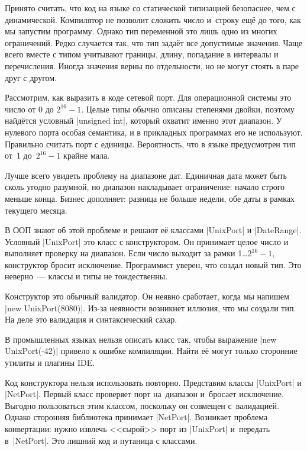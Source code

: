 \label{type-and-pred}


Принято считать, что код на языке со статической типизацией безопаснее, чем с
динамической. Компилятор не позволит сложить число и~строку ещ\"{е} до того, как мы
запустим программу. Однако тип переменной это лишь одно из многих
ограничений. Редко случается так, что тип зада\"{е}т все допустимые значения. Чаще
всего вместе с типом учитывают границы, длину, попадание в интервалы и
перечисления. Иногда значения верны по отдельности, но не могут стоять в паре
друг с другом.


Рассмотрим, как выразить в коде сетевой порт. Для операционной системы это число
от 0 до $2^{16}-1$. Целые типы обычно описаны степенями двойки, поэтому найд\"{е}тся
условный \spverb|unsigned int|, который охватит именно этот диапазон. У нулевого
порта особая семантика, и в прикладных программах его не используют. Правильно
считать порт с единицы. Вероятность, что в языке предусмотрен тип от~1
до~$2^{16}-1$ крайне мала.

Лучше всего увидеть проблему на диапазоне дат. Единичная дата может быть сколь
угодно разумной, но диапазон накладывает ограничение: начало строго меньше
конца. Бизнес дополняет: разница не больше недели, обе даты в рамках текущего
месяца.


В ООП знают об этой проблеме и решают е\"{е} классами \spverb|UnixPort| и
\spverb|DateRange|. Условный \spverb|UnixPort| это класс с конструктором. Он
принимает целое число и выполняет проверку на диапазон. Если число выходит за
рамки 1\dots$2^{16}-1$, конструктор бросит исключение. Программист уверен, что
создал новый тип. Это неверно~--- классы и типы не тождественны.

Конструктор это обычный валидатор. Он неявно сработает, когда мы напишем
\spverb|new UnixPort(8080)|. Из-за неявности возникнет иллюзия, что мы создали
тип. На деле это валидация и синтаксический сахар.


В промышленных языках нельзя описать класс так, чтобы выражение
\spverb|new UnixPort(-42)| привело к ошибке компиляции. Найти е\"{е} могут
только сторонние утилиты и плагины IDE.

Код конструктора нельзя использовать повторно. Представим классы
\spverb|UnixPort| и \spverb|NetPort|. Первый класс проверяет порт на~диапазон
и~бросает исключение. Выгодно пользоваться этим классом, поскольку он совмещен
с~валидацией. Однако сторонняя библиотека принимает \spverb|NetPort|. Возникает
проблема конвертации: нужно извлечь <<сырой>> порт из \spverb|UnixPort|
и~передать в~\spverb|NetPort|. Это лишний код и путаница с классами.

